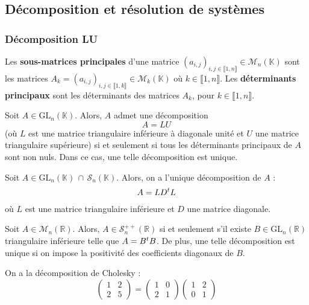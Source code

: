   \subsection{Décomposition et résolution de systèmes}

  \subsubsection{Décomposition LU}


  \begin{definition}
    Les \textbf{sous-matrices principales} d'une matrice $(a_{i,j})_{i,j \in \llbracket 1, n \rrbracket} \in \mathcal{M}_n(\mathbb{K})$ sont les matrices $A_k = (a_{i,j})_{i,j \in \llbracket 1, k \rrbracket} \in \mathcal{M}_k(\mathbb{K})$ où $k \in \llbracket 1, n \rrbracket$. Les \textbf{déterminants principaux} sont les déterminants des matrices $A_k$, pour $k \in \llbracket 1, n \rrbracket$.
  \end{definition}

  \begin{theorem}
    \label{154-2}
    Soit $A \in \mathrm{GL}_n(\mathbb{K})$. Alors, $A$ admet une décomposition
    \[ A = LU \]
    (où $L$ est une matrice triangulaire inférieure à diagonale unité et $U$ une matrice triangulaire supérieure) si et seulement si tous les déterminants principaux de $A$ sont non nuls. Dans ce cas, une telle décomposition est unique.
  \end{theorem}

  \begin{corollary}
    Soit $A \in \mathrm{GL}_n(\mathbb{K}) \, \cap \, \mathcal{S}_n(\mathbb{K})$. Alors, on a l'unique décomposition de $A$ :
    \[ A = LD\mathstrut ^t L \]
    où $L$ est une matrice triangulaire inférieure et $D$ une matrice diagonale.
  \end{corollary}

  \begin{application}
    Soit $A \in \mathcal{M}_n(\mathbb{R})$. Alors, $A \in \mathcal{S}_n^{++}(\mathbb{R})$ si et seulement s'il existe $B \in \mathrm{GL}_n(\mathbb{R})$ triangulaire inférieure telle que $A = B\mathstrut ^t B$. De plus, une telle décomposition est unique si on impose la positivité des coefficients diagonaux de $B$.
  \end{application}


  \begin{example}
    On a la décomposition de Cholesky :
    \[ \begin{pmatrix} 1 & 2 \\ 2 & 5 \end{pmatrix} = \begin{pmatrix} 1 & 0 \\ 2 & 1 \end{pmatrix} \begin{pmatrix} 1 & 2 \\ 0 & 1 \end{pmatrix} \]
  \end{example}

